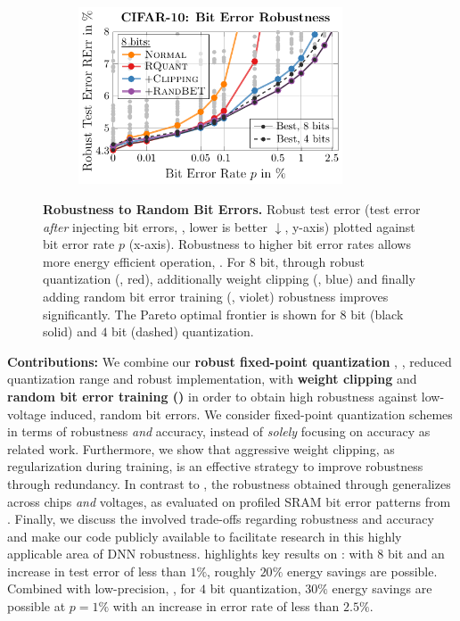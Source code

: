 \begin{figure}[t]
	\centering
	\vspace*{-0.1cm}
	\hspace*{-0.25cm}
	\begin{subfigure}{0.425\textwidth}
         \includegraphics[height=5.25cm]{c10_contributions_8bit}
    \end{subfigure}
    \vspace*{-8px}
    \caption{
    \textbf{Robustness to Random Bit Errors.} Robust test error (test error \emph{after} injecting bit errors, \RTE, lower is better $\downarrow$, y-axis) plotted against bit error rate $p$ (x-axis). Robustness to higher bit error rates allows more energy efficient operation, \cf {}. For $8$ bit, through robust quantization (\Quant, {\color{colorbrewer1}red}), additionally weight clipping (\Clipping, {\color{colorbrewer2}blue}) and finally adding random bit error training (\Random, {\color{colorbrewer4}violet}) robustness improves significantly. 
    The Pareto optimal frontier is shown for $8$ bit (black solid) and $4$ bit (dashed) quantization.
    }
    \label{fig:contributions}
    \vspace*{-0.2cm}
\end{figure} 

\textbf{Contributions:}
We combine our \textbf{robust fixed-point quantization \Quant}, \ie, reduced quantization range and robust implementation, with \textbf{weight clipping} and \textbf{random bit error training (\Random)} in order to obtain high robustness against low-voltage induced, random bit errors. We consider fixed-point quantization schemes in terms of robustness \emph{and} accuracy, instead of \emph{solely} focusing on accuracy as related work. Furthermore, we show that aggressive weight clipping, as regularization during training, is an effective strategy to improve robustness through redundancy. In contrast to \cite{KimDATE2018,KoppulaMICRO2019}, the robustness obtained through \Random generalizes across chips \emph{and} voltages, as evaluated on profiled SRAM bit error patterns from \cite{ChandramoorthyHPCA2019}. 
Finally, we discuss the involved trade-offs regarding robustness and accuracy and make our code publicly available to facilitate research in this highly applicable area of DNN robustness.  highlights key results on \CifarT: with $8$ bit and an increase in test error of less than $1\%$, roughly $20\%$ energy savings are possible. Combined with low-precision, \eg, for $4$ bit quantization, $30\%$ energy savings are possible at $p = 1\%$ with an increase in error rate of less than $2.5\%$. 

